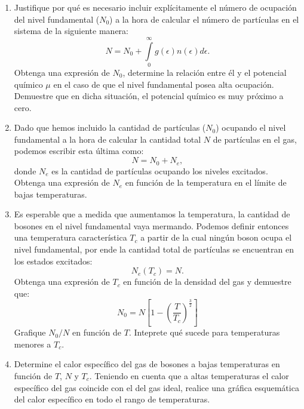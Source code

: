 \documentclass[a4paper,11pt]{article}
\begin{document}
\begin{enumerate}[label=(\alph*),
                  leftmargin=2\parindent,
                  rightmargin=2\parindent]

     \item{Justifique por qué es necesario incluir explícitamente el número 
           de ocupación del nivel fundamental ($N_0$) a la hora de calcular el 
           número de partículas en el sistema de la siguiente manera:
           $$ 
           N = 
           N_0 + \int\limits_0^\infty g(\epsilon) n(\epsilon) 
           d\epsilon.
           $$
           Obtenga una expresión de $N_0$, determine la relación entre él y el 
           potencial químico $\mu$ en el caso de que el nivel fundamental 
           posea alta ocupación.
           Demuestre que en dicha situación, el potencial químico es muy 
           próximo a cero.
           }

     \item{Dado que hemos incluido la cantidad de partículas ($N_0$) ocupando 
           el nivel fundamental a la hora de calcular la cantidad total $N$ de 
           partículas en el gas, podemos escribir esta última como:
           $$ N = N_0 + N_e, $$
           donde $N_e$ es la cantidad de partículas ocupando los niveles 
           excitados.
           Obtenga una expresión de $N_e$ en función de la temperatura en el 
           límite de bajas temperaturas.}
     
     \item{Es esperable que a medida que aumentamos la temperatura, la 
           cantidad de bosones en el nivel fundamental vaya mermando.
           Podemos definir entonces una temperatura característica $T_c$ a 
           partir de la cual ningún boson ocupa el nivel fundamental, por 
           ende la cantidad total de partículas se encuentran en los estados 
           excitados:
           $$ N_e(T_c) = N. $$
           Obtenga una expresión de $T_c$ en función de la densidad del gas 
           y demuestre que:
           $$ 
           N_0 =
           N \left[ 1 - \left( \frac{T}{T_c} \right)^\frac{3}{2} \right]
           $$
           Grafique $N_0/N$ en función de $T$.
           Inteprete qué sucede para temperaturas menores a $T_c$.
           }

     \item{Determine el calor específico del gas de bosones a bajas 
           temperaturas en función de $T$, $N$ y $T_c$.
           Teniendo en cuenta que a altas temperaturas el calor específico 
           del gas coincide con el del gas ideal, realice una gráfica 
           esquemática del calor específico en todo el rango de temperaturas.
           }

\end{enumerate}
\end{document}
